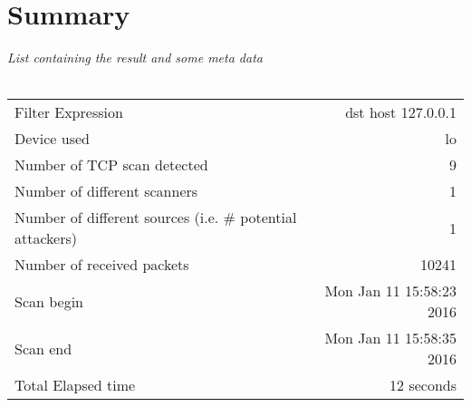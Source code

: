 \documentclass[a4paper]{scrartcl}
\begin{document}
\section{Summary}
\emph{List containing the result and some meta data} \\ \\ 
\begin{tabular}{| l | r |}
\hline
Filter Expression & dst host 127.0.0.1 \\ 
Device used & lo \\ 
Number of TCP scan detected & 9 \\ 
Number of different scanners & 1 \\ 
Number of different sources (i.e. \# potential attackers) & 1 \\ 
Number of received packets &  10241 \\ 
Scan begin & Mon Jan 11 15:58:23 2016
 \\ 
Scan end & 	Mon Jan 11 15:58:35 2016
 \\ 
Total Elapsed time & 12 seconds \\ 
\hline
\end{tabular}
\end{document}
